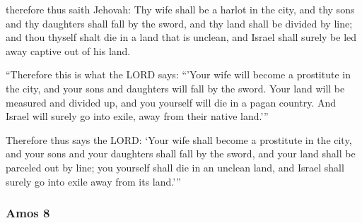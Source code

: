 			\begin{versebox}
					\item[BHS] 
					\item[LXX] 
					\item[ASV] therefore thus saith Jehovah: Thy wife shall be a harlot in the city, and thy sons and thy daughters shall fall by the sword, and thy land shall be divided by line; and thou thyself shalt die in a land that is unclean, and Israel shall surely be led away captive out of his land.
					\item[NIV] “Therefore this is what the LORD says: “’Your wife will become a prostitute in the city, and your sons and daughters will fall by the sword. Your land will be measured and divided up, and you yourself will die in a pagan country. And Israel will surely go into exile, away from their native land.’”
					\item[NRSV] Therefore thus says the LORD: ‘Your wife shall become a prostitute in the city, and your sons and your daughters shall fall by the sword, and your land shall be parceled out by line; you yourself shall die in an unclean land, and Israel shall surely go into exile away from its land.’”
			\end{versebox}
	\subsubsection{Amos 8} %
		\label{AMOS-8}

